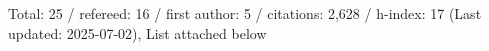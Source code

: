 Total: 25 / refereed: 16 / first author: 5 / citations: 2,628 / h-index: 17 (Last updated: 2025-07-02), List attached below